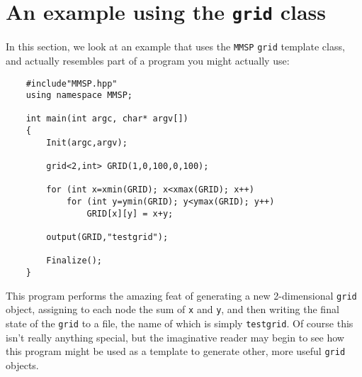 \section{An example using the {\tt grid} class}
In this section, we look at an example that uses the {\tt MMSP} {\tt grid} template class, and actually resembles part of a program you might actually use:
\begin{shadebox}
\begin{verbatim}
    #include"MMSP.hpp"
    using namespace MMSP;

    int main(int argc, char* argv[])
    {
        Init(argc,argv);

        grid<2,int> GRID(1,0,100,0,100);

        for (int x=xmin(GRID); x<xmax(GRID); x++)
            for (int y=ymin(GRID); y<ymax(GRID); y++)
                GRID[x][y] = x+y;

        output(GRID,"testgrid");

        Finalize();
    }
\end{verbatim}
\end{shadebox}
This program performs the amazing feat of generating a new 2-dimensional {\tt grid} object, assigning to each node the sum of {\tt x} and {\tt y}, and then writing the final state of the {\tt grid} to a file, the name of which is simply {\tt testgrid}.  Of course this isn't really anything special, but the imaginative reader may begin to see how this program might be used as a template to generate other, more useful {\tt grid} objects.

